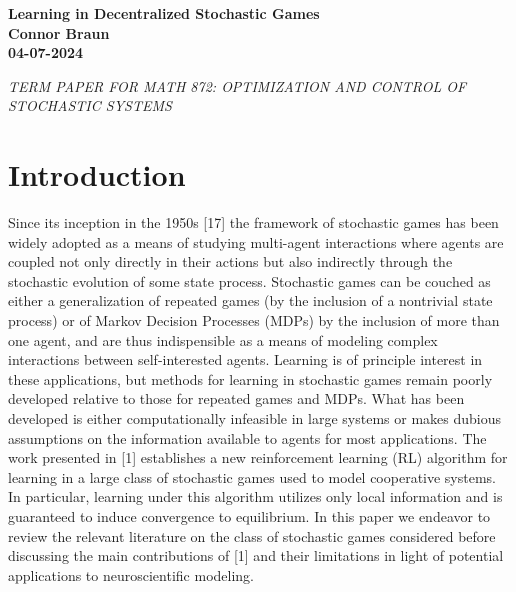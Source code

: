\documentclass[10pt]{article}
\newcommand{\1}[1]{\mathbbm{1}_{#1}}
\begin{document}
\begin{titlepage}
\vspace*{\fill}
\begin{center}
    {\bf\LARGE Learning in Decentralized Stochastic Games}\\[30pt]
    {\bf Connor Braun}\\[10pt]
    {\bf 04-07-2024}
\end{center}
\vspace*{\fill}
\begin{center}
    {\it TERM PAPER FOR MATH 872: OPTIMIZATION AND CONTROL OF STOCHASTIC SYSTEMS}
\end{center}
\end{titlepage}
\tableofcontents
\newpage
{}
\section*{Introduction}
Since its inception in the 1950s [17] the framework of stochastic games has been widely adopted
as a means of studying multi-agent interactions where agents are coupled not only directly in their actions
but also indirectly through the stochastic evolution of some state process. Stochastic games can be couched
as either a generalization of repeated games (by the inclusion of a nontrivial state process) or of Markov
Decision Processes (MDPs) by the inclusion of more than one agent, and are thus indispensible as a means of
modeling complex interactions between self-interested agents. Learning is of principle interest in these
applications, but methods for learning in stochastic games remain poorly developed relative to those for
repeated games and MDPs. What has been developed is either computationally infeasible in large systems
or makes dubious assumptions on the information available to agents for most applications. The work presented
in [1] establishes a new reinforcement learning (RL) algorithm for learning in a large
class of stochastic games used to model cooperative systems. In particular, learning under this algorithm
utilizes only local information and is guaranteed to induce convergence to equilibrium. In this paper we
endeavor to review the relevant literature on the class of stochastic games considered before discussing the
main contributions of [1] and their limitations in light of potential applications to neuroscientific modeling.
\end{document}
